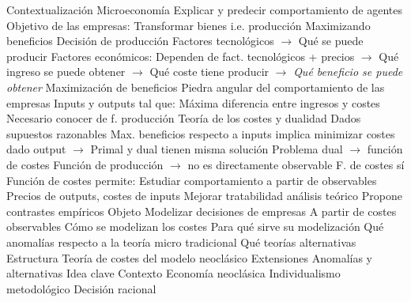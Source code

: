 \documentclass{nuevotema}
\begin{document}
\begin{esquemal}
	\1[] 
		\2 Contextualización
			\3 Microeconomía
				\4 Explicar y predecir comportamiento de agentes
				\4 Objetivo de las empresas:
				\4[$\to$] Transformar bienes i.e. producción
				\4[$\to$] Maximizando beneficios
			\3 Decisión de producción
				\4 Factores tecnológicos
				\4[] $\to$ Qué se puede producir
				\4 Factores económicos:
				\4[] Dependen de fact. tecnológicos + precios
				\4[] $\to$ Qué ingreso se puede obtener
				\4[] $\to$ Qué coste tiene producir
				\4[] $\to$ \textit{Qué beneficio se puede obtener}
			\3 Maximización de beneficios
				\4 Piedra angular del comportamiento de las empresas
				\4 Inputs y outputs tal que:
				\4[] Máxima diferencia entre ingresos y costes
				\4[$\to$] Necesario conocer de f. producción
			\3 Teoría de los costes y dualidad
				\4 Dados supuestos razonables
				\4 Max. beneficios respecto a inputs
				\4[] implica minimizar costes dado output
				\4[] $\to$ Primal y dual tienen misma solución
				\4 Problema dual $\to$ función de costes
				\4 Función de producción
				\4[] $\to$ no es directamente observable
				\4[$\to$] F. de costes sí
				\4 Función de costes permite:
				\4[$\to$] Estudiar comportamiento a partir de observables
				\4[] Precios de outputs, costes de inputs
				\4[$\to$] Mejorar tratabilidad análisis teórico
				\4[$\to$] Propone contrastes empíricos
		\2 Objeto
			\3 Modelizar decisiones de empresas
				\4 A partir de costes observables
			\3 Cómo se modelizan los costes
				\4 Para qué sirve su modelización
			\3 Qué anomalías respecto a la teoría micro tradicional
				\4 Qué teorías alternativas
		\2 Estructura
			\3 Teoría de costes del modelo neoclásico
			\3 Extensiones
			\3 Anomalías y alternativas
	\1 
		\2 Idea clave
			\3 Contexto
				\4 Economía neoclásica
				\4[] Individualismo metodológico
				\4[] Decisión racional


\end{esquemal}
\end{document}
